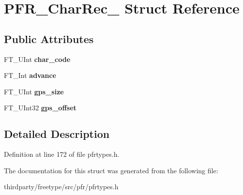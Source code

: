 \hypertarget{struct_p_f_r___char_rec__}{}\section{P\+F\+R\+\_\+\+Char\+Rec\+\_\+ Struct Reference}
\label{struct_p_f_r___char_rec__}
\subsection*{Public Attributes}
\begin{DoxyCompactItemize}
\item 
\mbox{\label{struct_p_f_r___char_rec___a2b71d5f6a2b9e40883ec5e471bb056c6}} 
F\+T\+\_\+\+U\+Int {\bfseries char\+\_\+code}
\item 
\mbox{\label{struct_p_f_r___char_rec___a8078980b8602d36de6cf445304fa5d99}} 
F\+T\+\_\+\+Int {\bfseries advance}
\item 
\mbox{\label{struct_p_f_r___char_rec___a96bc9b0057e0add10f9a8848e6619043}} 
F\+T\+\_\+\+U\+Int {\bfseries gps\+\_\+size}
\item 
\mbox{\label{struct_p_f_r___char_rec___a04b41b0f46e9a810da05280e3e75cee1}} 
F\+T\+\_\+\+U\+Int32 {\bfseries gps\+\_\+offset}
\end{DoxyCompactItemize}


\subsection{Detailed Description}


Definition at line 172 of file pfrtypes.\+h.



The documentation for this struct was generated from the following file\+:\begin{DoxyCompactItemize}
\item 
thirdparty/freetype/src/pfr/pfrtypes.\+h\end{DoxyCompactItemize}
